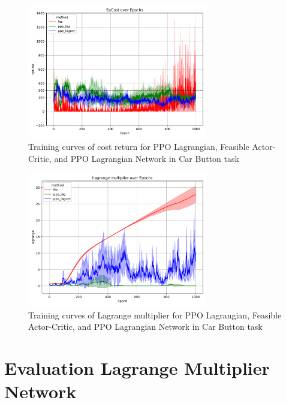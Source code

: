 \begin{figure}[h]
  \centering
  \includegraphics[width=0.7\textwidth]{imgs/chap4/car_button/cost.pdf}
  \caption{Training curves of cost return for PPO Lagrangian, Feasible Actor-Critic, and PPO Lagrangian Network in Car Button task}
  \label{chap4:fig:car_button_cost}
\end{figure}

\begin{figure}[h]
  \centering
  \includegraphics[width=0.7\textwidth]{imgs/chap4/car_button/lagrange.pdf}
  \caption{Training curves of Lagrange multiplier for PPO Lagrangian, Feasible Actor-Critic, and PPO Lagrangian Network in Car Button task}
  \label{chap4:fig:car_button_lagrange}
\end{figure}

\clearpage

\section{Evaluation Lagrange Multiplier Network}

